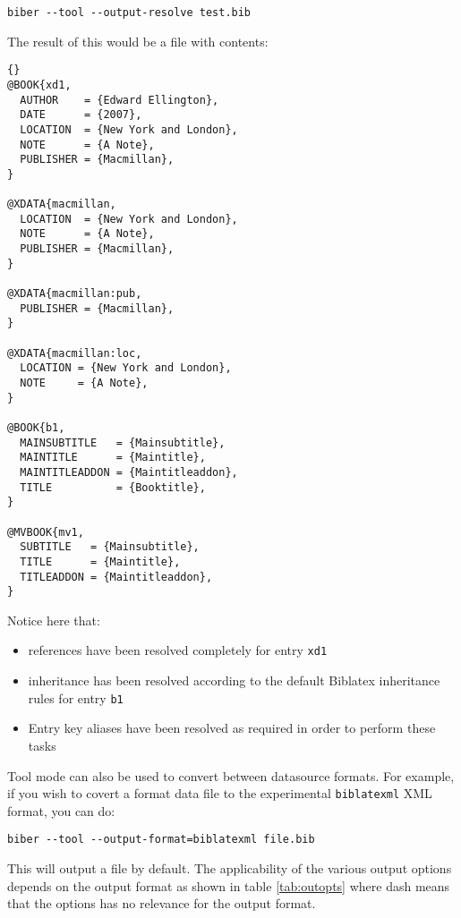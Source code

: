 \documentclass{ltxdockit}
\newcommand*{\biblatex}{Biblatex\xspace}
\begin{document}
\begin{verbatim}
biber --tool --output-resolve test.bib
\end{verbatim}
%
The result of this would be a file  with contents:

\begin{lstlisting}[style=bibtex, columns=fixed]{}
@BOOK{xd1,
  AUTHOR    = {Edward Ellington},
  DATE      = {2007},
  LOCATION  = {New York and London},
  NOTE      = {A Note},
  PUBLISHER = {Macmillan},
}

@XDATA{macmillan,
  LOCATION  = {New York and London},
  NOTE      = {A Note},
  PUBLISHER = {Macmillan},
}

@XDATA{macmillan:pub,
  PUBLISHER = {Macmillan},
}

@XDATA{macmillan:loc,
  LOCATION = {New York and London},
  NOTE     = {A Note},
}

@BOOK{b1,
  MAINSUBTITLE   = {Mainsubtitle},
  MAINTITLE      = {Maintitle},
  MAINTITLEADDON = {Maintitleaddon},
  TITLE          = {Booktitle},
}

@MVBOOK{mv1,
  SUBTITLE   = {Mainsubtitle},
  TITLE      = {Maintitle},
  TITLEADDON = {Maintitleaddon},
}
\end{lstlisting}
%
Notice here that:
\begin{itemize}
\item {} references have been resolved completely for entry
  \texttt{xd1}
\item {} inheritance has been resolved according to the
  default \biblatex inheritance rules for entry \texttt{b1}
\item Entry key aliases have been resolved as required in order to perform
  these tasks
\end{itemize}

Tool mode can also be used to convert between datasource
formats. For example, if you wish to covert a \bibtex format data file to
the experimental \texttt{biblatexml} XML format, you can do:

\begin{verbatim}
biber --tool --output-format=biblatexml file.bib
\end{verbatim}

\noindent This will output a file  by
default. The applicability of the various output options depends on
the output format as shown in table \ref{tab:outopts} where dash means that
the options has no relevance for the output format.
\end{document}
